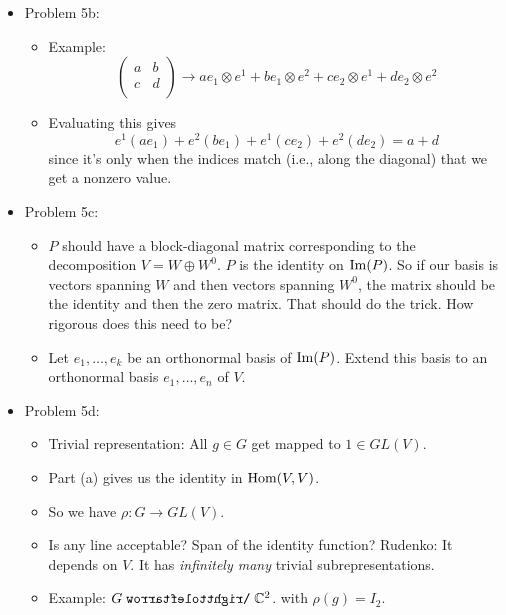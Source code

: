 \documentclass[../notes.tex]{subfiles}
\begin{document}
\begin{itemize}
\begin{itemize}
    \end{itemize}
    \item Problem 5b:
    \begin{itemize}
        \item Example:
        \begin{equation*}
            \begin{pmatrix}
                a & b\\
                c & d\\
            \end{pmatrix}
            \to
            ae_1\otimes e^1+be_1\otimes e^2+ce_2\otimes e^1+de_2\otimes e^2
        \end{equation*}
        \item Evaluating this gives
        \begin{equation*}
            e^1(ae_1)+e^2(be_1)+e^1(ce_2)+e^2(de_2) = a+d
        \end{equation*}
        since it's only when the indices match (i.e., along the diagonal) that we get a nonzero value.
    \end{itemize}
    \item Problem 5c:
    \begin{itemize}
        \item $P$ should have a block-diagonal matrix corresponding to the decomposition $V=W\oplus W^0$. $P$ is the identity on $\operatorname{Im}(P)$. So if our basis is vectors spanning $W$ and then vectors spanning $W^0$, the matrix should be the identity and then the zero matrix. That should do the trick. How rigorous does this need to be?
        \item Let $e_1,\dots,e_k$ be an orthonormal basis of $\operatorname{Im}(P)$. Extend this basis to an orthonormal basis $e_1,\dots,e_n$ of $V$.\par
    \end{itemize}
    \item Problem 5d:
    \begin{itemize}
        \item Trivial representation: All $g\in G$ get mapped to $1\in GL(V)$.
        \item Part (a) gives us the identity in $\operatorname{Hom}(V,V)$.
        \item So we have $\rho:G\to GL(V)$.
        \item Is any line acceptable? Span of the identity function? Rudenko: It depends on $V$. It has \emph{infinitely many} trivial subrepresentations.
        \item Example: $G\acts \C^2$. with $\rho(g)=I_2$.

\end{itemize}
\end{itemize}
\end{document}
